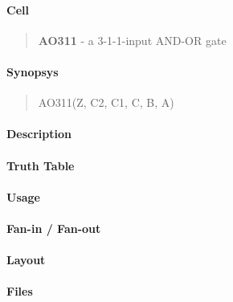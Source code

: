 \label{AO311}
\paragraph{Cell}
\begin{quote}
    \textbf{AO311} - a 3-1-1-input AND-OR gate
\end{quote}

\paragraph{Synopsys}
\begin{quote}
    AO311(Z, C2, C1, C, B, A)
\end{quote}

\paragraph{Description}

%

\paragraph{Truth Table}
%

\paragraph{Usage}

\paragraph{Fan-in / Fan-out}

\paragraph{Layout}

\paragraph{Files}
